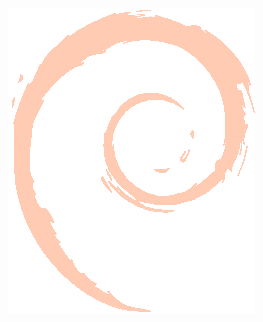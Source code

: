 
\setlength{\Separation}{.02\textwidth}
\def\Itemizesymbol{\item[\textcolor{debianred}{$\blacktriangleright$}]}
\def\Descriptionsymbol{\item[\hspace{-\Separation}\textcolor{debianred}{$\blacksquare$}\hspace{.5\Separation}}

\raggedleft

\begin{minipage}{.01\textwidth}
\includegraphics[width=100.\textwidth]{swirl}
\end{minipage}
%
\hfill
%
